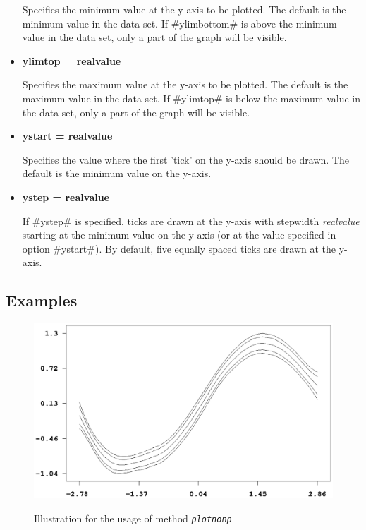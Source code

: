 \begin{itemize}
Specifies the minimum value at the y-axis to be plotted. The default
is the minimum value in the data set. If #ylimbottom# is above the
minimum value in the data set, only a part of the graph will be
visible.
\item {\bf ylimtop = realvalue}

Specifies the maximum value at the y-axis to be plotted. The default
is the maximum value in the data set. If #ylimtop# is below the
maximum value in the data set, only a part of the graph will be
visible.
\item {\bf ystart = realvalue}

Specifies the value where the first 'tick' on the y-axis should be
drawn. The default is the minimum value on the y-axis.
\item {\bf ystep = realvalue}

If #ystep# is specified,  ticks are drawn at the y-axis with
stepwidth {\em realvalue} starting at the minimum value on the
y-axis (or at the value specified in option #ystart#). By default,
five equally spaced ticks are drawn at the y-axis.
\end{itemize}


\subsection*{Examples}

\begin{figure}[ht]
\begin{center}
\includegraphics[scale=0.8]{grafiken/remlregplotnonpexample.ps}
{\em\caption{ \label{remlregplotnonpexample1} Illustration for the
usage of method \em\texttt{plotnonp}}}
\end{center}
\end{figure}


